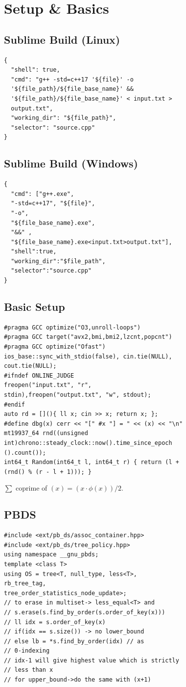 \section{Setup \texorpdfstring{\&}{&} Basics}
\subsection{Sublime Build (Linux)}
\begin{verbatim}
{
  "shell": true,
  "cmd": "g++ -std=c++17 '${file}' -o
  '${file_path}/${file_base_name}' &&
  '${file_path}/${file_base_name}' < input.txt >
  output.txt",
  "working_dir": "${file_path}",
  "selector": "source.cpp"
}
\end{verbatim}
\subsection{Sublime Build (Windows)}
\begin{verbatim}
{
  "cmd": ["g++.exe",
  "-std=c++17", "${file}",
  "-o",
  "${file_base_name}.exe",
  "&&" ,
  "${file_base_name}.exe<input.txt>output.txt"],
  "shell":true,
  "working_dir":"$file_path",
  "selector":"source.cpp"
}
\end{verbatim}
\subsection{Basic Setup}
\begin{verbatim}
#pragma GCC optimize("O3,unroll-loops")
#pragma GCC target("avx2,bmi,bmi2,lzcnt,popcnt")
#pragma GCC optimize("Ofast")
ios_base::sync_with_stdio(false), cin.tie(NULL),
cout.tie(NULL);
#ifndef ONLINE_JUDGE
freopen("input.txt", "r",
stdin),freopen("output.txt", "w", stdout);
#endif
auto rd = [](){ ll x; cin >> x; return x; };
#define dbg(x) cerr << "[" #x "] = " << (x) << "\n"
mt19937_64 rnd((unsigned
int)chrono::steady_clock::now().time_since_epoch
().count());
int64_t Random(int64_t l, int64_t r) { return (l +
(rnd() % (r - l + 1))); }
\end{verbatim}
$\sum$ coprime of $(x) = (x \cdot \phi(x))/2$.
\subsection{PBDS}
\begin{verbatim}
#include <ext/pb_ds/assoc_container.hpp>
#include <ext/pb_ds/tree_policy.hpp>
using namespace __gnu_pbds;
template <class T>
using OS = tree<T, null_type, less<T>,
rb_tree_tag,
tree_order_statistics_node_update>;
// to erase in multiset-> less_equal<T> and
// s.erase(s.find_by_order(s.order_of_key(x)))
// ll idx = s.order_of_key(x)
// if(idx == s.size()) -> no lower_bound
// else lb = *s.find_by_order(idx) // as
// 0-indexing
// idx-1 will give highest value which is strictly
// less than x
// for upper_bound->do the same with (x+1)
\end{verbatim}
